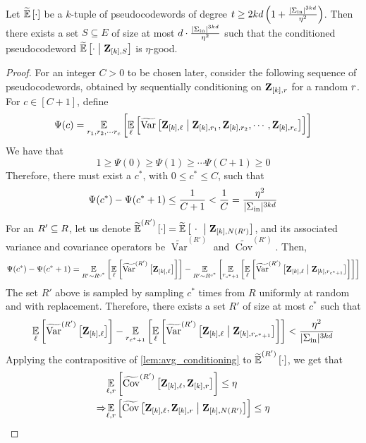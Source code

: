 \begin{lemma}\label{lem:condition_for_eta_good}
	Let $\tildeEx{\cdot}$ be a $k$-tuple of pseudocodewords of degree $t \geq 2kd\left(1+\frac{|\Sigma_{\mathrm{in}}|^{3kd}}{\eta^2}\right)$. Then there exists a set $S \subseteq E$ of size at most $d\cdot \frac{|\Sigma_{\mathrm{in}}|^{3kd}}{\eta^2}$ such that the conditioned pseudocodeword $\tildeEx{\cdot \given \zee_{[k],S}}$ is $\eta$-good.
\end{lemma}

\begin{proof}
	For an integer $C>0$ to be chosen later, consider the following sequence of pseudocodewords, obtained by sequentially conditioning on ${ \mathbf{Z} }_{[k],{ r }}$ for a random ${ r }$. For $c\in [C+1]$, define
	\[
		\Psi(c) = \Ex{\ri_1,\ri_2, \cdots \ri_c}{ \Ex{\li}{\tildeVar{ \zee_{[k],\li} \given \zee_{[k],\ri_1},\zee_{[k],\ri_2},\cdots ,\zee_{[k],r_c}}}}
	\]
	We have that
	\[
		1 \geq \Psi(0) \geq \Psi(1) \geq \cdots \Psi(C+1) \geq 0
	\]
	Therefore, there must exist a $c^*$, with $0\leq c^* \leq C$, such that
	\[
		\Psi(c^*) - \Psi(c^*+1) \leq \frac{1}{C+1} < \frac{1}{C} = \frac{\eta^2}{|\Sigma_{\mathrm{in}}|^{3kd}}
	\]
	For an $R'\subseteq R$, let us denote $\pcod{R'}{\cdot} = \tildeEx{~\cdot~ \given \zee_{[k],N(R')}}$, and its associated variance and covariance operators be $\widetilde{\operatorname{Var}}^{(R')}$ and $\widetilde{\operatorname{Cov}}^{(R')}$. Then,
	\[
		\Psi(c^*) - \Psi(c^*+1) = \Ex{R' \sim R^{c^*}}{\Ex{\li}{\widetilde{\operatorname{Var}}^{(R')}\left[\zee_{[k],\li}\right]}} - \Ex{R'\sim R^{c^*}}{ \Ex{\ri_{c^*+1}}{\Ex{\li}{\widetilde{\operatorname{Var}}^{(R')}\left[\zee_{[k],\li} \given \zee_{[k], \ri_{c^*+1} }\right]}}}
	\]
	The set $R'$ above is sampled by sampling $c^*$ times from $R$ uniformly at random and with replacement. Therefore, there exists a set $R'$ of size at most $c^*$ such that
	\[
		\Ex{\li}{\widetilde{\operatorname{Var}}^{(R')}\left[\zee_{[k],\li}\right]} -  \Ex{\ri_{c^*+1}}{\Ex{\li}{\widetilde{\operatorname{Var}}^{(R')}\left[\zee_{[k],\li} \given \zee_{[k], \ri_{c^*+1} }\right]}} < \frac{\eta^2}{|\Sigma_{\inn}|^{3kd}}
	\]
	Applying the contrapositive of \cref{lem:avg_conditioning} to $\widetilde{\operatorname*{\mathbb{E}}}^{(R')}\left[ \cdot \right]$, we get that
		\begin{align*}
		&\Ex{\li,\ri}{\widetilde{ \operatorname{Cov}}^{(R')} \left[ \zee_{[k],\li}, \zee_{[k],\ri} \right]}\leq \eta \\
		\implies &\Ex{\li,\ri}{\widetilde{\operatorname{Cov}}\left[\zee_{[k],\li}, \zee_{[k],\ri} \given \zee_{[k],N(R')} \right]} \leq \eta

\end{align*}
\end{proof}

